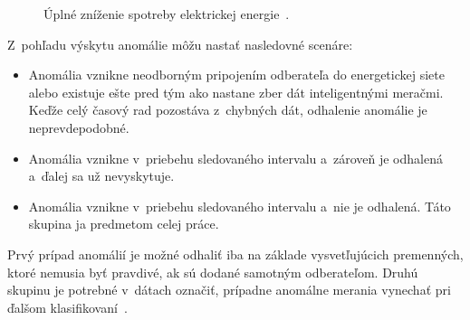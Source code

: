 \documentclass[a4paper,twoside,slovak,12pt,appendix]{article}
\begin{document}
\begin{figure}[]
\begin{minipage}{0.45\textwidth}
\begin{center}
			\caption{Úplné zníženie spotreby elektrickej energie~\cite{Trevizan2015}.}
			\label{fig:decrease-total}
    \end{center}
  \end{minipage}\hfill

\end{figure}

Z~pohľadu výskytu anomálie môžu nastať nasledovné scenáre:
\begin{itemize}
  \item Anomália vznikne neodborným pripojením odberateľa do energetickej siete alebo existuje ešte pred tým ako nastane zber dát inteligentnými meračmi.
        Keďže celý časový rad pozostáva z~chybných dát, odhalenie anomálie je neprevdepodobné.
  \item Anomália vznikne v~priebehu sledovaného intervalu a~zároveň je odhalená a~ďalej sa už nevyskytuje.
  \item Anomália vznikne v~priebehu sledovaného intervalu a~nie je odhalená. Táto skupina ja predmetom celej práce.
\end{itemize}
Prvý prípad anomálií je možné odhaliť iba na základe vysvetľujúcich premenných,
ktoré nemusia byť pravdivé, ak sú dodané samotným odberateľom. Druhú skupinu je
potrebné v~dátach označiť, prípadne anomálne merania vynechať pri ďalšom
klasifikovaní~\cite{Spiric2015}.


\end{document}

